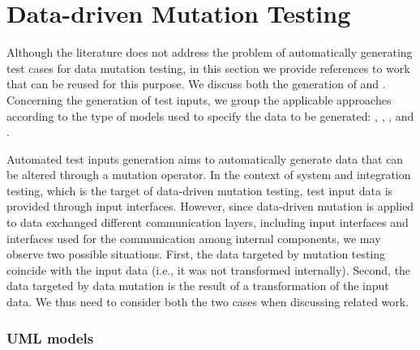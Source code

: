
\section{Data-driven Mutation Testing}
\label{sec:testGenerationData}



Although the literature does not address the problem of automatically generating test cases for data mutation testing, in this section we provide references to work that can be reused for this purpose. 
We discuss both the generation of  and . 
Concerning the generation of test inputs, we group the applicable approaches according to the type of models used to specify the data to be generated: , , , and . 

Automated test inputs generation aims to automatically generate data that can be altered through a mutation operator. 
In the context of system and integration testing, which is the target of data-driven mutation testing, test input data is provided through input interfaces. However, since data-driven mutation is applied to data exchanged different communication layers, including input interfaces and interfaces used for the communication among internal components, we may observe two possible situations. First, the data targeted by mutation testing coincide with the input data (i.e., it was not transformed internally). Second, the data targeted by data mutation is the result of a transformation of the input data. We thus need to consider both the two cases when discussing related work.

\subsubsection{UML models}




